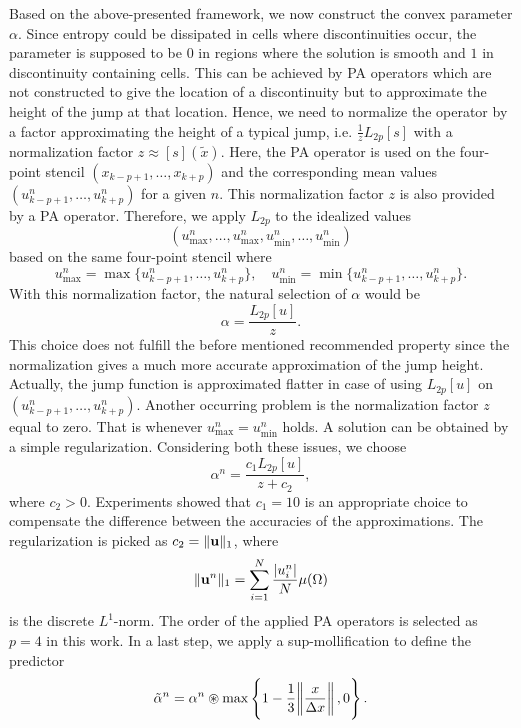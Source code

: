 Based on the above-presented framework, we now construct the convex parameter $\alpha$. Since entropy could be dissipated in cells where discontinuities occur, the parameter is supposed to be $0$ in regions where the solution is smooth and $1$ in discontinuity containing cells. This can be achieved by PA operators which are not constructed to give the location of a discontinuity but to approximate the height of the jump at that location. Hence, we need to normalize the operator by a factor approximating the height of a typical jump, i.e. $\frac{1}{z}L_{2p}[s]$ with a normalization factor $ z\approx[s](\tilde{x})$. Here, the PA operator is used on the four-point stencil $(x_{k-p+1},\ldots,x_{k+p})$ and the corresponding mean values $(u_{k-p+1}^n,\ldots,u_{k+p}^n)$ for  a given $n$. 
This normalization factor $z$ is also provided by a PA operator. Therefore, we apply $L_{2p}$ to the idealized values 
\begin{equation*}
 (u_{\max}^n,\ldots,u_{\max}^n,u_{\min}^n,\ldots,u_{\min}^n)
\end{equation*}
based on the same four-point stencil where 
\begin{equation*}
 u_{\max}^n = \max\{u_{k-p+1}^n,\ldots,u_{k+p}^n\},\hspace{1em} u_{\min}^n = \min\{u_{k-p+1}^n,\ldots,u_{k+p}^n\}.
\end{equation*}
With this normalization factor, the natural selection of $\alpha$ would be
\begin{equation*}
 \alpha = \frac{L_{2p}[u]}{z}.
\end{equation*}
This choice does not fulfill the before mentioned recommended property since the normalization gives a much more accurate approximation of the jump height. Actually, the jump function is approximated flatter in case of using $L_{2p}[u]$ on $(u_{k-p+1}^n,\ldots,u_{k+p}^n)$. Another occurring problem is the normalization factor $z$ equal to zero. That is whenever $u_{\max}^n= u_{\min}^n$ holds. A solution can be obtained by a simple regularization. Considering both these issues, we choose
\begin{equation}
 \alpha^n = \frac{c_1 L_{2p}[u]}{z + c_2},
\end{equation} 
where $c_2>0$. Experiments showed that $c_1=10$ is an appropriate choice to compensate the difference between the accuracies of the approximations. The regularization is picked as $c_2 = \|\mathbf{u}\|_1$, where
\begin{equation*}
 \|\mathbf{u}^n\|_1 = \sum_{i=1}^N \frac{|u_i^n|}{N}\mu(\Omega)
\end{equation*}
is the discrete $L^1$-norm. The order of the applied PA operators is selected as $p=4$ in this work. In a last step, we apply a sup-mollification to define the predictor
\begin{equation}
 \tilde{\alpha}^n = \alpha^n\circledast \max\left \{1-\frac{1}{3}\norm{\frac{x}{\Delta x}},0 \right\}.
\end{equation}







